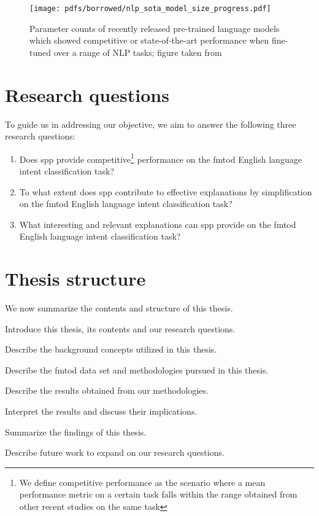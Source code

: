 \begin{figure}[t!]
  \centering
  \texttt{[image: pdfs/borrowed/nlp\_sota\_model\_size\_progress.pdf]}
  \caption{Parameter counts of recently released pre-trained language models
    which showed competitive or state-of-the-art performance when fine-tuned
    over a range of NLP tasks; figure taken from \citet{sanh2019distilbert}}
  \label{fig:nlp_progress}
\end{figure}

\section{Research questions}

\label{section:rq}

To guide us in addressing our objective, we aim to answer the following three
research questions:

\begin{enumerate}
  \item Does \ac{spp} provide competitive\footnote{We define
    competitive performance as the scenario where a mean performance metric on a
    certain task falls within the range obtained from other recent studies on
    the same task} performance on the \ac{fmtod} English language intent classification task?
  \item To what extent does \ac{spp} contribute to effective explanations by
  simplification on the \ac{fmtod} English language intent classification task?
  \item What interesting and relevant explanations can \ac{spp} provide on the
  \ac{fmtod} English language intent classification task?
\end{enumerate}

\section{Thesis structure}

We now summarize the contents and structure of this thesis.

\begin{description}[align=left]
  \item [Chapter \ref{chapter:introduction}:] Introduce this thesis, its
  contents and our research questions.
  \item [Chapter \ref{chapter:background}:] Describe the background concepts
  utilized in this thesis.
  \item [Chapter \ref{chapter:methodologies}:] Describe the \ac{fmtod} data set and
  methodologies pursued in this thesis.
  \item [Chapter \ref{chapter:results}:] Describe the results obtained from our
  methodologies.
  \item [Chapter \ref{chapter:discussion}:] Interpret the results and discuss their
  implications.
  \item [Chapter \ref{chapter:conclusions}:] Summarize the findings
  of this thesis.
  \item [Chapter \ref{chapter:further_work}:] Describe future work to expand on
  our research questions.
\end{description}


